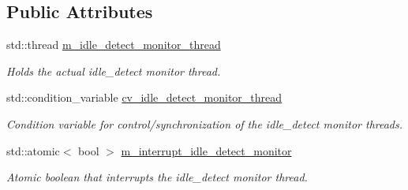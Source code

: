 \subsection*{Public Attributes}
\begin{DoxyCompactItemize}
\item 
\mbox{\label{classEventDetect_1_1IdleDetectMonitor_a64c5c35a0464fd41d34f8186f73ec61f}} 
std\+::thread \mbox{\hyperlink{classEventDetect_1_1IdleDetectMonitor_a64c5c35a0464fd41d34f8186f73ec61f}{m\+\_\+idle\+\_\+detect\+\_\+monitor\+\_\+thread}}
\begin{DoxyCompactList}\small\item\em Holds the actual idle\+\_\+detect monitor thread. \end{DoxyCompactList}\item 
\mbox{\label{classEventDetect_1_1IdleDetectMonitor_ab87d238be94053688b977a25384f8c1f}} 
std\+::condition\+\_\+variable \mbox{\hyperlink{classEventDetect_1_1IdleDetectMonitor_ab87d238be94053688b977a25384f8c1f}{cv\+\_\+idle\+\_\+detect\+\_\+monitor\+\_\+thread}}
\begin{DoxyCompactList}\small\item\em Condition variable for control/synchronization of the idle\+\_\+detect monitor threads. \end{DoxyCompactList}\item 
\mbox{\label{classEventDetect_1_1IdleDetectMonitor_a1563d170414bbb849532ab972457c7cc}} 
std\+::atomic$<$ bool $>$ \mbox{\hyperlink{classEventDetect_1_1IdleDetectMonitor_a1563d170414bbb849532ab972457c7cc}{m\+\_\+interrupt\+\_\+idle\+\_\+detect\+\_\+monitor}}
\begin{DoxyCompactList}\small\item\em Atomic boolean that interrupts the idle\+\_\+detect monitor thread. \end{DoxyCompactList}\end{DoxyCompactItemize}
